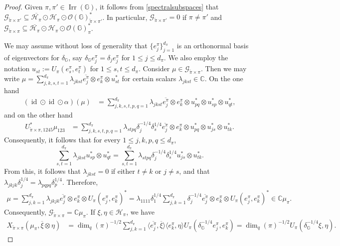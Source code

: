 \documentclass[10pt,a4paper]{amsart}
\DeclareMathOperator{\Irr}{\mathrm{Irr}}
\DeclareMathOperator{\id}{\mathrm{id}}
\newcommand{\C}{\mathbb{C}}
\newcommand{\G}{\mathbb{G}}
\newcommand{\mcG}{\mathcal{G}}
\newcommand{\mcH}{\mathcal{H}}
\newcommand{\mcO}{\mathcal{O}}
\begin{document}
\begin{proof}  Given $\pi, \pi'\in \Irr(\G)$, it follows from \eqref{spectralsubspaces}  that
$\mcG_{\tilde{\pi}\times \pi'}\subseteq \overline{\mcH_{\pi}}\odot \mcH_\pi \odot \mcO(\G)_{\tilde{\pi}\times \pi'}^*$. In particular, $\mcG_{\tilde{\pi}\times \pi'}= 0$ if $\pi \ne \pi'$ and $\mcG_{\tilde{\pi}\times \pi}\subseteq \overline{\mcH_\pi}\odot \mcH_\pi \odot \mcO(\G)_\pi^*$. 

We may assume without loss of generality that $\{e_j^\pi\}_{j=1}^{d_\pi}$ is an orthonormal basis of eigenvectors for $\delta_\G$, say $\delta_\G e_j^\pi= \delta_j e_j^\pi$ for $1\le j \le d_\pi$. We also employ the notation $u_{st}:= U_\pi(e_s^\pi, e_t^\pi)$ for $1\le s,t \le d_\pi$. Consider $\mu\in  \mcG_{\tilde{\pi}\times \pi}$. Then we may write  $\mu = \sum_{j,k,s,t=1}^{d_\pi} \lambda_{jkst}\overline{e_j^\pi}\otimes e_k^\pi \otimes u_{st}^*$ for certain scalars $\lambda_{jkst}\in \C$. On the one hand
\begin{align*}
    (\id \odot \id \odot \alpha)(\mu)&= \sum_{j,k,s,t,p,q=1}^{d_\pi} \lambda_{jkst}\overline{e_j^\pi}\otimes e_k^\pi\otimes u_{pq}^*\otimes u_{sp}^*\otimes u_{qt}^*,
\end{align*}
and on the other hand
\begin{align*}U_{\tilde{\pi}\times \pi, 1245}^*\mu_{123}&= \sum_{j,k,s,t,p,q=1}^{d_\pi}  \lambda_{stpq} \delta_j^{-1/4}\delta_s^{1/4} \overline{e_j^\pi}\otimes e_k^\pi\otimes u_{pq}^* \otimes u_{js}^*\otimes u_{tk}^*. \end{align*}
Consequently, it follows that for every $1\le j,k,p,q\le d_\pi$, 
$$\sum_{s,t=1}^{d_\pi} \lambda_{jkst}  u_{sp}^*\otimes u_{qt}^* = \sum_{s,t=1}^{d_\pi} \lambda_{stpq} \delta_j^{-1/4}\delta_s^{1/4} u_{js}^*\otimes u_{tk}^*.$$
From this, it  follows that $\lambda_{jkst}=0$ if either $t\ne k$ or $j\ne s$, and that $\lambda_{jkjk}\delta_j^{1/4}= \lambda_{pqpq}\delta_p^{1/4}$. Therefore,
\begin{align*}
    \mu = \sum_{j,k=1}^{d_\pi} \lambda_{jkjk} \overline{e_j^\pi}\otimes e_k^\pi \otimes U_\pi(e_j^\pi, e_k^\pi)^*= \lambda_{1111}\delta_1^{1/4}\sum_{j,k=1}^{d_\pi} \delta_j^{-1/4} \overline{e_j^\pi}\otimes e_k^\pi \otimes U_\pi(e_j^\pi, e_k^\pi)^* \in \C \mu_\pi.
\end{align*}
Consequently, $\mcG_{\tilde{\pi}\times  \pi}= \C \mu_\pi$. If $\xi, \eta \in \mcH_\pi$, we have
\begin{align*}
    X_{\tilde{\pi}\times \pi}(\mu_\pi, \overline{\xi}\otimes \eta)&= \dim_q(\pi)^{-1/2}\sum_{j,k=1}^{d_\pi}\langle \overline{e_j^\pi}, \overline{\xi}\rangle \langle e_k^\pi, \eta\rangle U_{\pi}(\delta_\G^{-1/4}e_j^\pi, e_k^\pi)= \dim_q(\pi)^{-1/2} U_\pi(\delta_\G^{-1/4}\xi, \eta).

\end{align*}
\end{proof}
\end{document}
